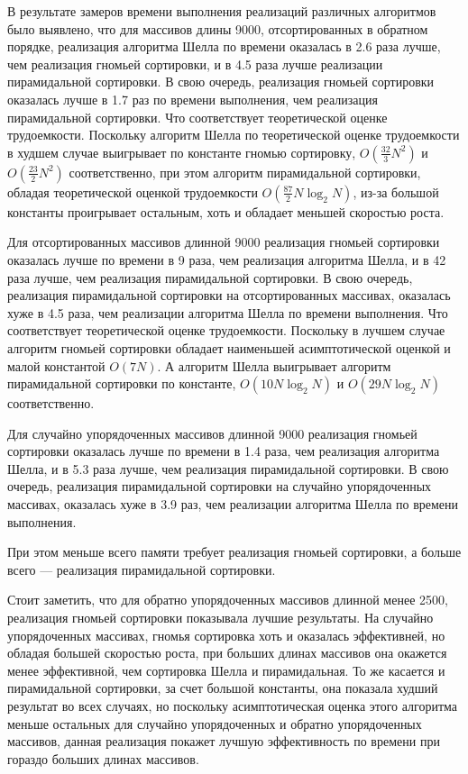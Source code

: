 В результате замеров времени выполнения реализаций различных алгоритмов было выявлено, что для массивов длины 9000, отсортированных в обратном порядке, реализация алгоритма Шелла по времени оказалась в 2.6 раза лучше, чем реализация гномьей сортировки, и в 4.5 раза лучше реализации пирамидальной сортировки. 
В свою очередь, реализация гномьей сортировки оказалась лучше в 1.7 раз по времени выполнения, чем реализация пирамидальной сортировки.
Что соответствует теоретической оценке трудоемкости. 
Поскольку алгоритм Шелла по теоретической оценке трудоемкости в худшем случае выигрывает по константе гномью сортировку, $O(\frac{32}{3}N^2)$ и $O(\frac{23}{2}N^2)$ соответственно, при этом алгоритм пирамидальной сортировки, обладая теоретической оценкой трудоемкости $O(\frac{87}{2} N \log_2N)$, из-за большой константы проигрывает остальным, хоть и обладает меньшей скоростью роста.

Для отсортированных массивов длинной 9000 реализация гномьей сортировки оказалась лучше по времени в 9 раза, чем реализация алгоритма Шелла, и в 42 раза лучше, чем реализация пирамидальной сортировки. 
В свою очередь, реализация пирамидальной сортировки на отсортированных массивах, оказалась хуже в 4.5 раза, чем реализации алгоритма Шелла по времени выполнения. 
Что соответствует теоретической оценке трудоемкости.
Поскольку в лучшем случае алгоритм гномьей сортировки обладает наименьшей асимптотической оценкой и малой константой $O(7N)$. А алгоритм Шелла выигрывает алгоритм пирамидальной сортировки по константе, $O(10 N \log_2N)$ и $O(29 N \log_2N)$ соответственно.

Для случайно упорядоченных массивов длинной 9000 реализация гномьей сортировки оказалась лучше по времени в 1.4 раза, чем реализация алгоритма Шелла, и в 5.3 раза лучше, чем реализация пирамидальной сортировки. 
В свою очередь, реализация пирамидальной сортировки на случайно упорядоченных массивах, оказалась хуже в 3.9 раз, чем реализации алгоритма Шелла по времени выполнения.

При этом меньше всего памяти требует реализация гномьей сортировки, а больше всего --- реализация пирамидальной сортировки.

Стоит заметить, что для обратно упорядоченных массивов длинной менее 2500, реализация гномьей сортировки показывала лучшие результаты. 
На случайно упорядоченных массивах, гномья сортировка хоть и оказалась эффективней, но обладая большей скоростью роста, при больших длинах массивов она окажется менее эффективной, чем сортировка Шелла и пирамидальная. 
То же касается и пирамидальной сортировки, за счет большой константы, она показала худший результат во всех случаях, но поскольку асимптотическая оценка этого алгоритма меньше остальных для случайно упорядоченных и обратно упорядоченных массивов, данная реализация покажет лучшую эффективность по времени при гораздо больших длинах массивов.